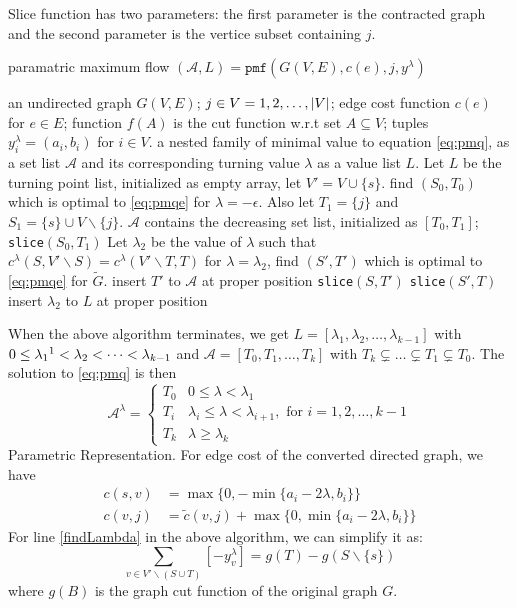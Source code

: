 \documentclass{article}
\begin{document}
Slice function has two parameters:
the first parameter is the contracted graph and the second parameter is the vertice subset containing $j$.
\begin{algorithm}
\caption{paramatric maximum flow $(\mathcal{A}, L) = \texttt{pmf}(G(V,E), c(e), j, y^{\lambda})$}
\begin{algorithmic}[1]
\REQUIRE an undirected graph $G(V, E)$; $j \in V={1,2,\dots, \lvert V\rvert}$; edge cost function $c(e)$ for $e \in E$; function $f(A)$ is the cut function w.r.t set $A\subseteq V$; tuples $y^{\lambda}_i = (a_i, b_i)$ for $i \in V$.
\ENSURE a nested family of minimal value to equation \eqref{eq:pmq}, as a set list $\mathcal{A}$ and its corresponding turning value $\lambda$ as a value list $L$.
\STATE Let $L$ be the turning point list, initialized as empty array, let $V'=V\cup\{s\}$.
\STATE find $(S_0, T_0)$ which is optimal to \eqref{eq:pmqe} for $ \lambda  = -\epsilon$.  Also let $T_1 = \{j\}$ and $S_1 = \{s\}\cup V \backslash \{j\}$.
\STATE $\mathcal{A}$ contains the decreasing set list, initialized as $[T_0, T_1]$;
\STATE \texttt{slice}$( S_0, T_1)$
  \STATE Let $\lambda_2$ be the value of $\lambda$ such that $c^{\lambda}(S, V'\backslash S) = 
c^{\lambda}(V'\backslash T, T)$ \label{findLambda}
\STATE for $\lambda = \lambda_2$, find $(S', T')$ which is optimal to \eqref{eq:pmqe} for $\widetilde{G}$.
\STATE insert $T'$ to $\mathcal{A}$ at proper position
\STATE \texttt{slice}$(S, T')$
\STATE \texttt{slice}$(S', T)$
\ELSE
\STATE insert $\lambda_2$ to $L$ at proper position
\ENDIF
\ENDFUNCTION
\end{algorithmic}
\end{algorithm}
When the above algorithm terminates, we get $L=[\lambda_1, \lambda_2, \dots, \lambda_{k-1}]$ with
$0 \leq \lambda_1 \footnotemark < \lambda_2 < \dots < \lambda_{k-1}$ and $\mathcal{A} = [T_0, T_1, \dots, T_k]$ with 
$T_k \subsetneq  \dots \subsetneq T_1 \subsetneq T_0$.  The solution to \eqref{eq:pmq} is then
\begin{equation}
\mathcal{A}^{\lambda}=\begin{cases}
T_0 & 0 \leq \lambda < \lambda_1 \\
T_i & \lambda_i \leq \lambda < \lambda_{i+1}, \textrm{ for } i=1, 2, \dots, k-1 \\
T_k & \lambda \geq \lambda_{k}
\end{cases}
\end{equation}
Parametric Representation. For edge cost of the converted directed graph, we have
\begin{align}
c(s, v) &=  \max\{0, -\min\{a_i-2\lambda, b_i\}\} \\
c(v, j) & = \tilde{c}(v, j) + \max\{0, \min\{a_i - 2\lambda, b_i\}\}
\end{align}
For line \ref{findLambda} in the above algorithm,  we can simplify it as:
\begin{equation*}
\sum_{v\in V'\backslash (S\cup T)} [-y^{\lambda}_v ] = g(T)-g(S\backslash\{s\})
\end{equation*}
where $g(B)$ is the graph cut function of the original graph $G$.
\end{document}
